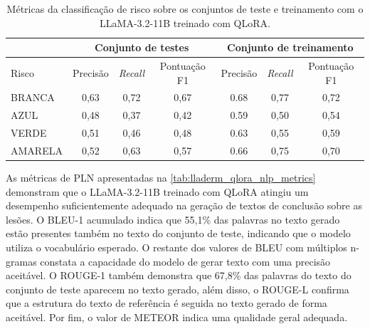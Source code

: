 \begin{table}[ht]
    \caption{\small Métricas da classificação de risco sobre os conjuntos de teste e treinamento com o
    \ac{LLaMA}-3.2-11B treinado com \ac{QLoRA}.}
    \centering
    \begin{tabular}{l|c|c|c|c|c|c}
        \hline
                        & \multicolumn{3}{c|}{Conjunto de testes} & \multicolumn{3}{c}{Conjunto de treinamento}
        \\ \hline
        Risco           & Precisão                                & \textit{Recall}
                        & Pontuação F1                            & Precisão
                        &
        \textit{Recall} & Pontuação F1
        \\ \hline
        BRANCA          & 0,63                                    & 0,72
                        & 0,67                                    & 0.68                                        & 0,77
                        & 0,72
        \\
        AZUL            & 0,48                                    & 0,37
                        & 0,42                                    & 0.59                                        & 0,50
                        & 0,54
        \\
        VERDE           & 0,51                                    & 0,46
                        & 0,48                                    & 0.63                                        & 0,55
                        & 0,59
        \\
        AMARELA         & 0,52                                    & 0,63
                        & 0,57                                    & 0.66                                        & 0,75
                        & 0,70
        \\ \hline
    \end{tabular}
    \label{tab:lladerm_qlora_risk_classification_report}
\end{table}

As métricas de \ac{PLN} apresentadas na \autoref{tab:lladerm_qlora_nlp_metrics} demonstram que o \ac{LLaMA}-3.2-11B
treinado com \ac{QLoRA} atingiu um desempenho suficientemente adequado na geração de textos de conclusão sobre as
lesões. O \ac{BLEU}-1 acumulado indica que 55,1\% das palavras no texto gerado estão presentes também no texto do
conjunto de teste, indicando que o modelo utiliza o vocabulário esperado. O restante dos valores de \ac{BLEU} com
múltiplos n-gramas constata a capacidade do modelo de gerar texto com uma precisão aceitável. O \ac{ROUGE}-1 também
demonstra que 67,8\% das palavras do texto do conjunto de teste aparecem no texto gerado, além disso, o \ac{ROUGE}-L
confirma que a estrutura do texto de referência é seguida no texto gerado de forma aceitável. Por fim, o valor de
\ac{METEOR} indica uma qualidade geral adequada.

